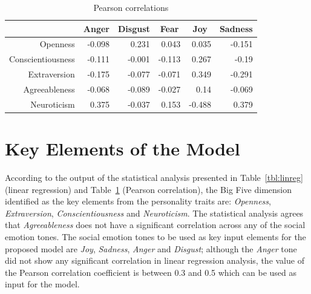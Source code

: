 \documentclass[graybox]{svmult}
\begin{document}
{{{\begin{table}[!ht]
\centering
\begin{tabular}{@{}rrrrrr@{}}
\toprule
                  & \multicolumn{1}{c}{Anger}  & \multicolumn{1}{c}{Disgust} & \multicolumn{1}{c}{Fear}   & \multicolumn{1}{c}{Joy}    & \multicolumn{1}{c}{Sadness} \\ 
\midrule
Openness          & -0.098 & 0.231   & 0.043  & 0.035  & -0.151  \\
Conscientiousness & -0.111 & -0.001  & -0.113 & 0.267  & -0.19   \\
Extraversion      & -0.175 & -0.077  & -0.071 & 0.349  & -0.291  \\
Agreeableness     & -0.068 & -0.089  & -0.027 & 0.14   & -0.069  \\
Neuroticism       & 0.375  & -0.037  & 0.153  & -0.488 & 0.379   \\ 

\bottomrule
\end{tabular}
\caption{Pearson correlations}
\label{tab:pearson}
\end{table}


\section{Key Elements of the Model}\label{model}

According to the output of the statistical analysis presented in
Table~\ref{tbl:linreg} (linear regression) and Table~\ref{tab:pearson}
(Pearson correlation), the Big Five dimension identified as the key
elements from the personality traits are: {\emph{Openness}},
{\emph{Extraversion}}, {\emph{Conscientiousness}} and
{\emph{Neuroticism}}. The statistical analysis agrees that
{\emph{Agreeableness}} does not have a significant correlation across
any of the social emotion tones. The social emotion tones to be used
as key input elements for the proposed model are {\emph{Joy}},
{\emph{Sadness}}, {\emph{Anger}} and {\emph{Disgust}}; although the
{\emph{Anger}} tone did not show any significant correlation in linear
regression analysis, the value of the Pearson correlation coefficient
is between 0.3 and 0.5 which can be used as input for the model.


}}}
\end{document}
